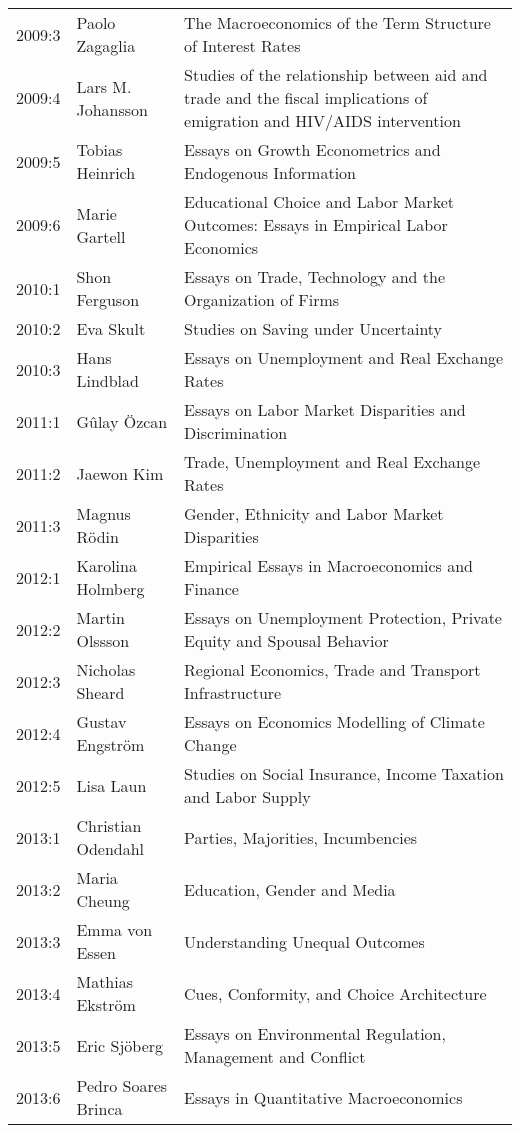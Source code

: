 {\begin{longtable}{p{} p{} p{}}
    2009:3 & Paolo Zagaglia & The Macroeconomics of the Term Structure of Interest Rates \\
    2009:4 & Lars M. Johansson & Studies of the relationship between aid and trade and the fiscal implications of emigration and HIV/AIDS intervention \\
    2009:5 & Tobias Heinrich & Essays on Growth Econometrics and Endogenous Information \\
    2009:6 & Marie Gartell & Educational Choice and Labor Market Outcomes: Essays in Empirical Labor Economics \\
    2010:1 & Shon Ferguson & Essays on Trade, Technology and the Organization of Firms \\
    2010:2 & Eva Skult & Studies on Saving under Uncertainty \\
    2010:3 & Hans Lindblad & Essays on Unemployment and Real Exchange Rates \\
    2011:1 & Gûlay Özcan & Essays on Labor Market Disparities and Discrimination \\
    2011:2 & Jaewon Kim & Trade, Unemployment and Real Exchange Rates \\
    2011:3 & Magnus Rödin & Gender, Ethnicity and Labor Market Disparities \\
    2012:1 & Karolina Holmberg & Empirical Essays in Macroeconomics and Finance \\
    2012:2 & Martin Olssson & Essays on Unemployment Protection, Private Equity and Spousal Behavior \\
    2012:3 & Nicholas Sheard & Regional Economics, Trade and Transport Infrastructure \\
    2012:4 & Gustav Engström & Essays on Economics Modelling of Climate Change \\
    2012:5 & Lisa Laun & Studies on Social Insurance, Income Taxation and Labor Supply \\
    2013:1 & Christian Odendahl & Parties, Majorities, Incumbencies \\
    2013:2 & Maria Cheung & Education, Gender and Media \\
    2013:3 & Emma von Essen & Understanding Unequal Outcomes \\
    2013:4 & Mathias Ekström & Cues, Conformity, and Choice Architecture \\
    2013:5 & Eric Sjöberg & Essays on Environmental Regulation, Management and Conflict \\
    2013:6 & Pedro Soares Brinca & Essays in Quantitative Macroeconomics \\

\end{longtable}}
